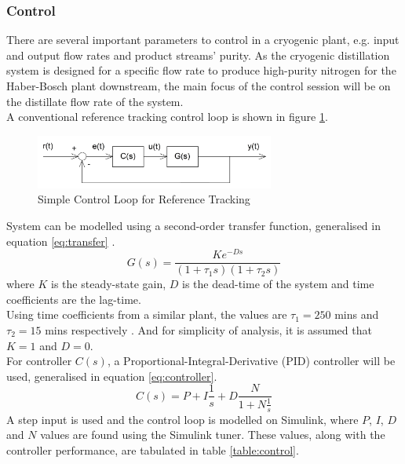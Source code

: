 \documentclass[11pt,oneside]{article}
\begin{document}
	\subsubsection{Control} \noindent
    	There are several important parameters to control in a cryogenic plant, e.g. input and output flow rates and product streams' purity. As the cryogenic distillation system is designed for a specific flow rate to produce high-purity nitrogen for the Haber-Bosch plant downstream, the main focus of the control session will be on the distillate flow rate of the system.\\
    	A conventional reference tracking control loop is shown in figure \ref{fig:control_loop}.
    	\begin{figure}[H]
    	    \centering
    	    \includegraphics[width=0.7\textwidth]{control_loop.jpg}
    	    \caption{Simple Control Loop for Reference Tracking}
    	    \label{fig:control_loop}
    	\end{figure}
    	\noindent System can be modelled using a second-order transfer function, generalised in equation \ref{eq:transfer} \citep{control_transfer_function}.
    	\begin{equation}
    	    G(s) = \frac{Ke^{-Ds}}{(1+\tau _1s)(1+\tau _2s)}
    	    \label{eq:transfer}
    	\end{equation}
    	where $K$ is the steady-state gain, $D$ is the dead-time of the system and time coefficients are the lag-time. \\
    	Using time coefficients from a similar plant, the values are $\tau _1 = 250$ mins and $\tau _2 = 15$ mins respectively \citep{control_time_coefficient}. And for simplicity of analysis, it is assumed that $K = 1$ and $D = 0$.\\
    	For controller $C(s)$, a Proportional-Integral-Derivative (PID) controller will be used, generalised in equation \ref{eq:controller}.
    	\begin{equation}
    	    C(s) = P+I\frac{1}{s}+D\frac{N}{1+N\frac{1}{s}}
    	    \label{eq:controller}
    	\end{equation}
    	A step input is used and the control loop is modelled on Simulink, where $P$, $I$, $D$ and $N$ values are found using the Simulink tuner. These values, along with the controller performance, are tabulated in table \ref{table:control}.
\end{document}
